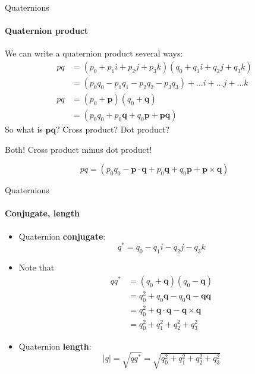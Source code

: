 \documentclass[aspectratio=169]{beamer}
\begin{document}
\begin{frame}{Quaternions}
	\framesubtitle{Quaternion product}

    We can write a quaternion product several ways:
    \begin{align*}
      pq &= (p_0 + p_1 i + p_2 j + p_3 k)  (q_0 + q_1 i + q_2 j + q_3 k)\\
            &= (p_0 q_0 - p_1 q_1 - p_2 q_2 - p_3 q_3) + \ldots i + \ldots j + \ldots k \\
      pq &= (p_0 + \mathbf{p}) (q_0 + \mathbf{q}) \\
            &= (p_0 q_0 + p_0 \mathbf{q} + q_0 \mathbf{p} + \mathbf{p} \mathbf{q})
    \end{align*}
    So what is $\mathbf{p} \mathbf{q}$?  Cross product?  Dot product?
    
    Both!  Cross product minus dot product!
    
    \begin{equation}
        pq = (p_0 q_0 - \mathbf{p} \cdot \mathbf{q} + p_0 \mathbf{q} + q_0 \mathbf{p} + \mathbf{p} \times \mathbf{q}) 
    \end{equation}

\end{frame}




\begin{frame}{Quaternions}
	\framesubtitle{Conjugate, length}

    \begin{itemize}
        \item Quaternion \textbf{conjugate}:
        \begin{equation}
        q^* = q_0 - q_1 i - q_2 j - q_3 k
        \end{equation}
        \item Note that
        \begin{align*}
        q q^* &= (q_0 + \mathbf{q})(q_0 - \mathbf{q}) \\
                    &= q_0^2 + q_0 \mathbf{q} - q_0 \mathbf{q} - \mathbf{q} \mathbf{q}  \\
                    &= q_0^2 + \mathbf{q} \cdot \mathbf{q} - \mathbf{q} \times \mathbf{q}  \\
                    &= q_0^2 + q_1^2 + q_2^2 + q_3^2
        \end{align*}
        \item Quaternion \textbf{length}:
        \begin{equation}
            |q| = \sqrt{q q^*} = \sqrt{q_0^2 + q_1^2 + q_2^2 + q_3^2} 
        \end{equation}
    \end{itemize}
\end{frame}
\end{document}
